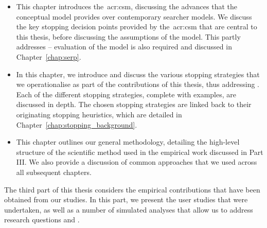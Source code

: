 \begin{itemize}
    \item[]{ This chapter introduces the~\gls{acr:csm}, discussing the advances that the conceptual model provides over contemporary searcher models. We discuss the key stopping decision points provided by the~\gls{acr:csm} that are central to this thesis, before discussing the assumptions of the model. This partly addresses  -- evaluation of the model is also required and discussed in Chapter~\ref{chap:serp}.}
    
    \item[]{ In this chapter, we introduce and discuss the various stopping strategies that we operationalise as part of the contributions of this thesis, thus addressing . Each of the different stopping strategies, complete with examples, are discussed in depth. The chosen stopping strategies are linked back to their originating stopping heuristics, which are detailed in Chapter~\ref{chap:stopping_background}.}
    
    \item[]{ This chapter outlines our general methodology, detailing the high-level structure of the scientific method used in the empirical work discussed in Part III. We also provide a discussion of common approaches that we used across all subsequent chapters.}
\end{itemize}

\noindent
{}
The third part of this thesis considers the empirical contributions that have been obtained from our studies. In this part, we present the user studies that were undertaken, as well as a number of simulated analyses that allow us to address research questions  and .

